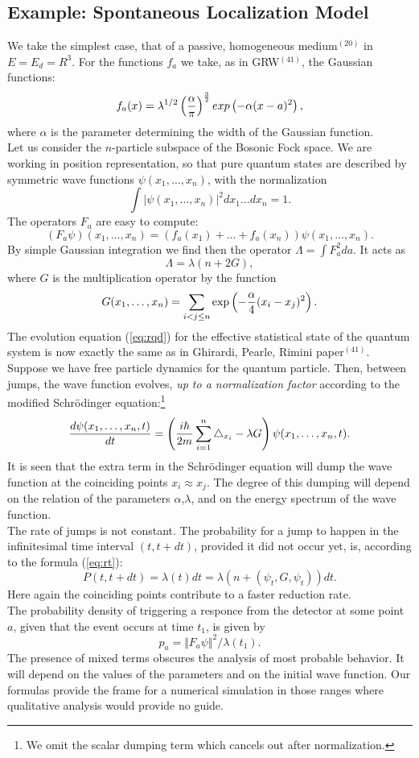 \documentclass[12pt]{article}
\def\be{\begin{equation}}
\def\ee{\end{equation}}
\begin{document}
\subsection{Example: Spontaneous Localization Model}
We take the simplest case, that of a passive, homogeneous medium$^{(20)}$ in
$E=E_d=R^3$. For the functions $f_a$ we take,
as in GRW$^{(41)}$, the Gaussian functions:
\be f_a(x)=\lambda^{1/2}\left({\alpha\over\pi}\right)^{3\over 2}
exp\left({-\alpha (x-a)^2}\right), \ee where $\alpha$ is the parameter
determining the width of the Gaussian function.\\ Let us consider the
$n$-particle subspace of the Bosonic Fock space. We are working in
position representation, so that pure quantum states are described by
symmetric wave functions $\psi(x_1,\ldots ,x_n)$, with the normalization
\be
 \int \vert \psi(x_1,\ldots ,x_n)\vert^2 dx_1\ldots dx_n =1 .
 \ee
 The operators $F_a$ are easy to compute:
 \be
 \left(F_a\psi\right)(x_1,\ldots ,x_n)=
 \left(f_a(x_1)+\ldots +f_a(x_n)\right)\psi(x_1,\ldots ,x_n) .
 \ee
By simple Gaussian integration we find then the operator
$\Lambda=\int F_a^2 da$. It acts as
\be
\Lambda=\lambda(n+2G),
\ee
where $G$ is the multiplication operator by the function
\be G(x_1,\ldots ,x_n)=\sum_{i<j\le n}\exp\left(-{\alpha\over
4}(x_i-x_j)^2\right).
\ee
The evolution equation (\ref{eq:rqd}) for the effective statistical
state of the quantum system is now exactly the same as in Ghirardi,
Pearle, Rimini paper$^{(41)}$.
Suppose we have free particle dynamics for the quantum particle. Then,
between jumps, the wave function evolves, {\sl up to a normalization
factor} according to the modified Schr\"odinger
equation:\footnote{We omit the scalar dumping term which cancels
out after normalization.}
\be
{{d\psi(x_1,\ldots, x_n,t)}\over
{dt}}=\left({{i\hbar}\over{2m}}\sum_{i=1}^n\triangle_{x_i}
-\lambda G\right)\psi(x_1,\ldots ,x_n,t).
\ee
It is seen that the extra term in the Schr\"odinger equation will dump
the wave function at the coinciding points $x_i\approx x_j$. The degree
of this dumping will depend on the relation of the parameters
$\alpha$,$\lambda$, and on the energy spectrum of the wave function.\\
The rate of jumps is not constant. The probability for a jump to happen in
the infinitesimal time interval $(t,t+dt)$, provided it did not occur
yet, is, according to the formula (\ref{eq:rt}):
\be
P(t,t+dt)=\lambda(t)dt=
\lambda\left(n+(\psi_t,G,\psi_t)\right)dt.
\ee
Here again the coinciding points contribute to a faster reduction
rate.\\ The probability density of triggering a responce from the
detector at some point $a$, given that the event occurs at time $t_1$,
is given by
\be
p_a = \Vert F_a\psi\Vert^2/\lambda(t_1).
\ee
The presence of mixed terms obscures the analysis of most probable
behavior. It will depend on the values of the parameters and on the
initial wave function. Our formulas provide the frame for a numerical
simulation in those ranges where qualitative analysis would provide no
guide.\\
\end{document}
